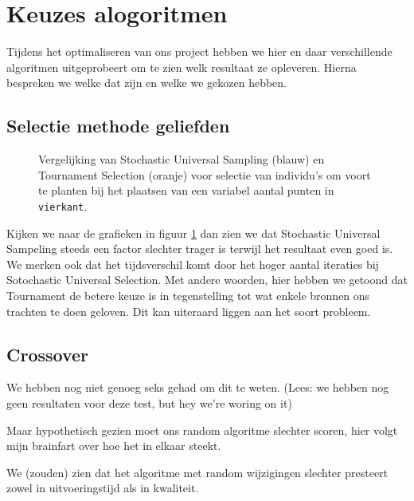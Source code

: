 %
\section{Keuzes alogoritmen}
Tijdens het optimaliseren van ons project hebben we hier en daar verschillende algoritmen uitgeprobeert om te zien welk resultaat ze opleveren. Hierna bespreken we welke dat zijn en welke we gekozen hebben.
\subsection{Selectie methode geliefden}
\label{sub:algLoverSelection}


\begin{figure}[H]
\caption{Vergelijking van Stochastic Universal Sampling (blauw) en Tournament Selection (oranje) voor selectie van individu's om voort te planten bij het plaatsen van een variabel aantal punten in \texttt{vierkant}.}
\label{graf:algLoverSelection}
\end{figure}
Kijken we naar de grafieken in figuur \ref{graf:algLoverSelection} dan zien we dat Stochastic Universal Sampeling steeds een factor slechter trager is terwijl het resultaat even goed is. We merken ook dat het tijdsverschil komt door het hoger aantal iteraties bij Sotochastic Universal Selection. Met andere woorden, hier hebben we getoond dat Tournament de betere keuze is in tegenstelling tot wat enkele bronnen ons trachten te doen geloven. Dit kan uiteraard liggen aan het soort probleem.


\subsection{Crossover}
We hebben nog niet genoeg seks gehad om dit te weten. (Lees: we hebben nog geen resultaten voor deze test, but hey we're woring on it)

Maar hypothetisch gezien moet ons random algoritme slechter scoren, hier volgt mijn brainfart over hoe het in elkaar steekt.

We (zouden) zien dat het algoritme met random wijzigingen slechter presteert zowel in uitvoeringstijd als in kwaliteit.

